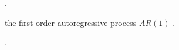 \documentclass[
thesis.tex
]{subfiles}
\begin{document}
\begin{definition}
	\cite[Lecture 5, p.4]{solis-garcia_ucb_2022}.
\end{definition}

\begin{definition}
	the first-order autoregressive process $AR(1)$ \cite[Lecture 5, p.4]{solis-garcia_ucb_2022}.
\end{definition}

\begin{definition}
	\cite[Hands on 5, p.14]{solis-garcia_ucb_2022}.
\end{definition}













\end{document}
